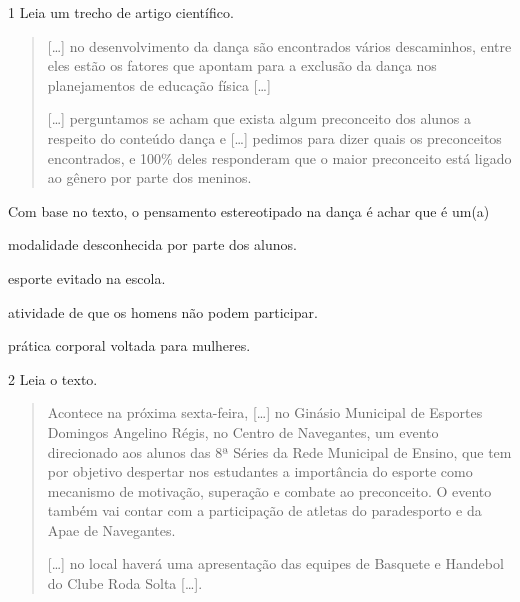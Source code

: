 \num{1} Leia um trecho de artigo científico.
\begin{quote}
  {[}\ldots{}{]} no desenvolvimento da dança são encontrados vários
  descaminhos, entre eles estão os fatores que apontam para a exclusão
  da dança nos planejamentos de educação física {[}\ldots{}{]}

{[}\ldots{}{]} perguntamos se acham que exista algum preconceito dos alunos a
respeito do conteúdo dança e {[}\ldots{}{]} pedimos para dizer quais os
preconceitos encontrados, e 100\% deles responderam que o maior
preconceito está ligado ao gênero por parte dos meninos.

\end{quote}

\noindent{}Com base no texto, o pensamento estereotipado na dança é achar que é um(a)

\begin{escolha}
\item modalidade desconhecida por parte dos alunos.

\item esporte evitado na escola.

\item atividade de que os homens não podem participar.

\item prática corporal voltada para mulheres.
\end{escolha}


\num{2} Leia o texto.
\begin{quote}
  Acontece na próxima sexta-feira, {[}\ldots{}{]} no Ginásio Municipal de
  Esportes Domingos Angelino Régis, no Centro de Navegantes, um evento
  direcionado aos alunos das 8ª Séries da Rede Municipal de Ensino, que
  tem por objetivo despertar nos estudantes a importância do esporte
  como mecanismo de motivação, superação e combate ao preconceito. O
  evento também vai contar com a participação de atletas do paradesporto
  e da Apae de Navegantes.

{[}\ldots{}{]} no local haverá uma apresentação das equipes de Basquete e
Handebol do Clube Roda Solta {[}\ldots{}{]}.

\end{quote}

